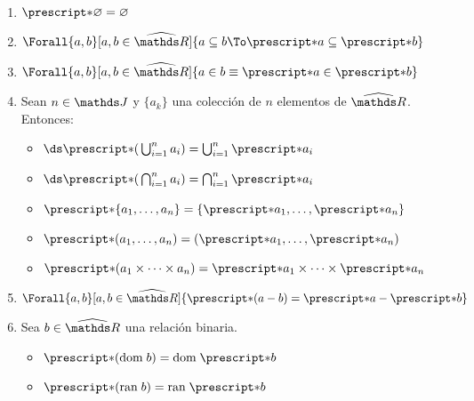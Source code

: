 \begin{lemma}~
  \begin{enumerate}
    \item $\st{\varnothing} = \varnothing$
    \item $\Forall{a,b}[a,b\in\Rh]{a \subseteq b \To \st{a} \subseteq \st{b}}$
    \item $\Forall{a,b}[a,b\in\Rh]{a\in b \equiv \st{a} \in \st{b}}$
    \item Sean $n\in\J$ y $\{a_k\}$ una colección de $n$ elementos de
          $\Rh$. Entonces:
          \begin{itemize}
            \item $\ds\st{\left(\,\bigcup_{i=1}^n a_i\right)}=\bigcup_{i=1}^n \st{a_i}$
            \item $\ds\st{\left(\,\bigcap_{i=1}^n a_i\right)}=\bigcap_{i=1}^n \st{a_i}$
            \item $\st{\{a_1,\dots,a_n\}} = \{\st{a_1},\dots,\st{a_n}\}$
            \item $\st{(a_1,\dots,a_n)} = (\st{a_1},\dots,\st{a_n})$
            \item $\st{(a_1 \times \dots \times a_n)} = 
                    \st{a_1} \times \dots \times \st{a_n}$
          \end{itemize}
    \item $\Forall{a,b}[a,b\in\Rh]{\st{(a - b)} = \st{a} - \st{b}}$
    \item Sea $b\in\Rh$ una relación binaria.
          \begin{itemize}
            \item $\st{(\dom b)} = \dom \st{b}$
            \item $\st{(\ran b)} = \ran \st{b}$
          \end{itemize}
  \end{enumerate}
\end{lemma}
\pagebreak
